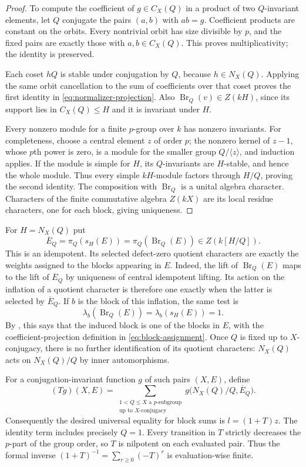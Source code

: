 \begin{proof}
To compute the coefficient of $g\in C_X(Q)$ in a product of two
$Q$-invariant elements, let $Q$ conjugate the pairs $(a,b)$ with
$ab=g$. Coefficient products are constant on the orbits. Every
nontrivial orbit has size divisible by $p$, and the fixed pairs are
exactly those with $a,b\in C_X(Q)$. This proves multiplicativity;
the identity is preserved.

Each coset $hQ$ is stable under conjugation by $Q$, because
$h\in N_X(Q)$. Applying the same orbit cancellation to the sum
of coefficients over that coset proves the first identity in
\eqref{eq:normalizer-projection}. Also
$\operatorname{Br}_Q(v)\in Z(kH)$, since its support lies in
$C_X(Q)\leq H$ and it is invariant under $H$.

Every nonzero module for a finite $p$-group over $k$ has nonzero
invariants. For completeness, choose a central element $z$ of order
$p$; the nonzero kernel of $z-1$, whose $p$th power is zero, is a
module for the smaller group $Q/\langle z\rangle$, and induction
applies. If the module is simple for $H$, its $Q$-invariants are
$H$-stable, and hence the whole module. Thus every simple $kH$-module
factors through $H/Q$, proving the second identity. The composition
with $\operatorname{Br}_Q$ is a unital algebra character. Characters
of the finite commutative algebra $Z(kX)$ are its local residue
characters, one for each block, giving uniqueness.
\end{proof}

For $H=N_X(Q)$ put
\[
 \overline E_Q
   =\pi_Q(s_H(E))
   =\pi_Q(\operatorname{Br}_Q(E))\in Z(k[H/Q]).
\]
This is an idempotent. Its selected defect-zero quotient characters
are exactly the weights assigned to the blocks appearing in $E$.
Indeed, the lift of $\operatorname{Br}_Q(E)$ maps to the lift of
$\overline E_Q$ by uniqueness of central idempotent lifting. Its
action on the inflation of a quotient character is therefore one
exactly when the latter is selected by $\overline E_Q$. If $b$ is
the block of this inflation, the same test is
\[
 \lambda_b(\operatorname{Br}_Q(E))
   =\lambda_b(s_H(E))=1.
\]
By , this says that the induced block
is one of the blocks in $E$, with the coefficient-projection
definition in \eqref{eq:block-assignment}. Once $Q$ is fixed up to $X$-conjugacy,
there is no further identification of its quotient characters:
$N_X(Q)$ acts on $N_X(Q)/Q$ by inner automorphisms.

For a conjugation-invariant function $g$ of such pairs $(X,E)$,
define
\begin{equation}\label{eq:weight-transform}
 (Tg)(X,E)=
 \sum_{\substack{1<Q\leq X\text{ a $p$-subgroup}\\
                  \text{up to }X\text{-conjugacy}}}
 g\bigl(N_X(Q)/Q,\overline E_Q\bigr).
\end{equation}
Consequently the desired universal equality for block sums is
$l=(1+T)z$. The identity term includes precisely $Q=1$.
Every transition in $T$ strictly decreases the $p$-part of the group
order, so $T$ is nilpotent on each evaluated pair. Thus the formal
inverse $(1+T)^{-1}=\sum_{r\geq0}(-T)^r$ is evaluation-wise finite.

